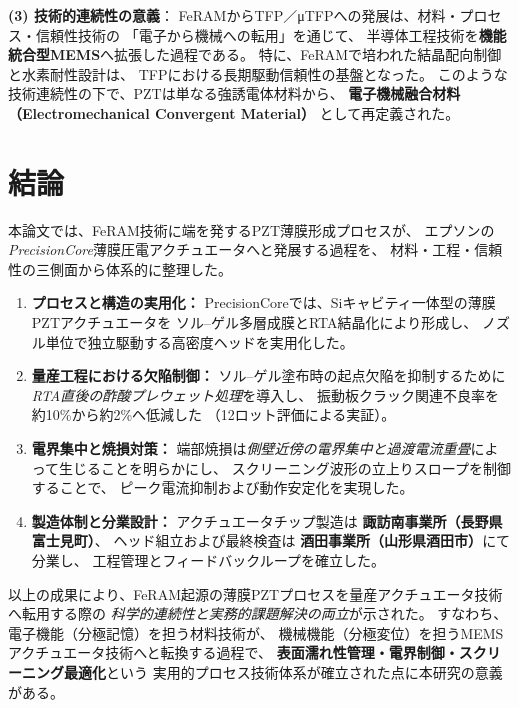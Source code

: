\documentclass[conference]{IEEEtran}
\begin{document}
\medskip
\noindent
\textbf{(3) 技術的連続性の意義}：
FeRAMからTFP／μTFPへの発展は、材料・プロセス・信頼性技術の
「電子から機械への転用」を通じて、
半導体工程技術を\textbf{機能統合型MEMS}へ拡張した過程である。
特に、FeRAMで培われた結晶配向制御と水素耐性設計は、
TFPにおける長期駆動信頼性の基盤となった。
このような技術連続性の下で、PZTは単なる強誘電体材料から、
\textbf{電子機械融合材料（Electromechanical Convergent Material）}
として再定義された。

\section{結論}
本論文では、FeRAM技術に端を発するPZT薄膜形成プロセスが、
エプソンの\textit{PrecisionCore}薄膜圧電アクチュエータへと発展する過程を、
材料・工程・信頼性の三側面から体系的に整理した。

\begin{enumerate}[label=(\arabic*)]
  \item \textbf{プロセスと構造の実用化：}
  PrecisionCoreでは、Siキャビティ一体型の薄膜PZTアクチュエータを
  ソル–ゲル多層成膜とRTA結晶化により形成し、
  ノズル単位で独立駆動する高密度ヘッドを実用化した\cite{uemura2014mems}。

  \item \textbf{量産工程における欠陥制御：}
  ソル–ゲル塗布時の起点欠陥を抑制するために
  \emph{RTA直後の酢酸プレウェット処理}を導入し、
  振動板クラック関連不良率を約10\%から約2\%へ低減した
  （12ロット評価による実証）。

  \item \textbf{電界集中と焼損対策：}
  端部焼損は\emph{側壁近傍の電界集中と過渡電流重畳}によって生じることを明らかにし、
  スクリーニング波形の立上りスロープを制御することで、
  ピーク電流抑制および動作安定化を実現した。

  \item \textbf{製造体制と分業設計：}
  アクチュエータチップ製造は
  \textbf{諏訪南事業所（長野県富士見町）}、
  ヘッド組立および最終検査は
  \textbf{酒田事業所（山形県酒田市）}にて分業し、
  工程管理とフィードバックループを確立した。
\end{enumerate}

\medskip
以上の成果により、FeRAM起源の薄膜PZTプロセスを量産アクチュエータ技術へ転用する際の
\emph{科学的連続性と実務的課題解決の両立}が示された。
すなわち、電子機能（分極記憶）を担う材料技術が、
機械機能（分極変位）を担うMEMSアクチュエータ技術へと転換する過程で、
\textbf{表面濡れ性管理・電界制御・スクリーニング最適化}という
実用的プロセス技術体系が確立された点に本研究の意義がある。
\end{document}
